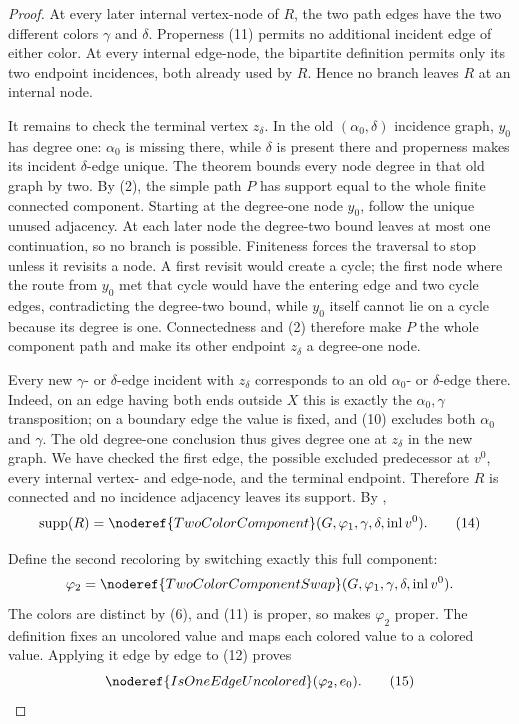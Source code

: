 \begin{proof}
At every later internal vertex-node of $R$, the two path edges have the
two different colors $\gamma$ and $\delta$.  Properness (11) permits no
additional incident edge of either color.  At every internal edge-node,
the bipartite definition  permits only
its two endpoint incidences, both already used by $R$.  Hence no branch
leaves $R$ at an internal node.

It remains to check the terminal vertex $z_\delta$.  In the old
$(\alpha_0,\delta)$ incidence graph, $y_0$ has degree one: $\alpha_0$ is
missing there, while $\delta$ is present there and properness makes its
incident $\delta$-edge unique.  The theorem
 bounds every node degree in
that old graph by two.  By (2), the simple path $P$ has support equal to
the whole finite connected component.  Starting at the degree-one node
$y_0$, follow the unique unused adjacency.  At each later node the
degree-two bound leaves at most one continuation, so no branch is
possible.  Finiteness forces the traversal to stop unless it revisits a
node.  A first revisit would create a cycle; the first node where the
route from $y_0$ met that cycle would have the entering edge and two cycle
edges, contradicting the degree-two bound, while $y_0$ itself cannot lie
on a cycle because its degree is one.  Connectedness and (2) therefore
make $P$ the whole component path and make its other endpoint
$z_\delta$ a degree-one node.

Every new $\gamma$- or $\delta$-edge incident with $z_\delta$ corresponds
to an old $\alpha_0$- or $\delta$-edge there.  Indeed, on an edge having
both ends outside $X$ this is exactly the $\alpha_0,\gamma$
transposition; on a boundary edge the value is fixed, and (10) excludes
both $\alpha_0$ and $\gamma$.  The old degree-one conclusion thus gives
degree one at $z_\delta$ in the new graph.  We have checked the first
edge, the possible excluded predecessor at $v^0$, every internal vertex-
and edge-node, and the terminal endpoint.  Therefore $R$ is connected and
no incidence adjacency leaves its support.  By
,
\[
 \operatorname{supp}(R)=
 \noderef{TwoColorComponent}
   (G,\varphi_1,\gamma,\delta,\operatorname{inl}v^0).           \tag{14}
\]

Define the second recoloring by switching exactly this full component:
\[
 \varphi_2=\noderef{TwoColorComponentSwap}
   (G,\varphi_1,\gamma,\delta,\operatorname{inl}v^0).
\]
The colors are distinct by (6), and (11) is proper, so
 makes $\varphi_2$ proper.  The
definition  fixes an uncolored value and
maps each colored value to a colored value.  Applying it edge by edge to
(12) proves
\[
 \noderef{IsOneEdgeUncolored}(\varphi_2,e_0).                  \tag{15}
\]


\end{proof}
